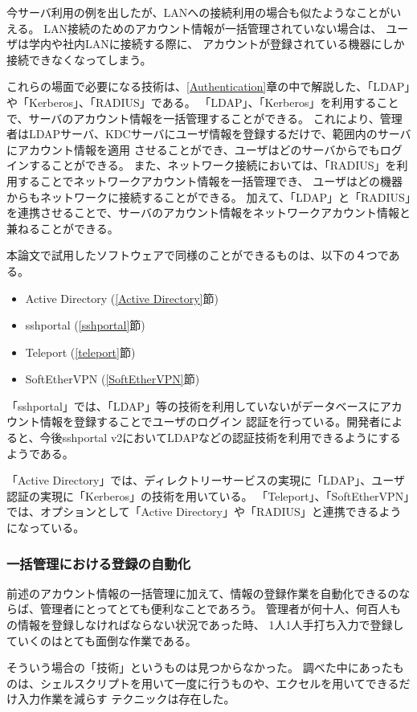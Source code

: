 \documentclass[11pt,a4j,titlepage]{jreport}
\begin{document}
今サーバ利用の例を出したが、LANへの接続利用の場合も似たようなことがいえる。
LAN接続のためのアカウント情報が一括管理されていない場合は、 ユーザは学内や社内LANに接続する際に、
アカウントが登録されている機器にしか接続できなくなってしまう。

これらの場面で必要になる技術は、\ref{Authentication}章の中で解説した、「LDAP」や「Kerberos」、「RADIUS」である。
「LDAP」、「Kerberos」を利用することで、サーバのアカウント情報を一括管理することができる。
これにより、管理者はLDAPサーバ、KDCサーバにユーザ情報を登録するだけで、範囲内のサーバにアカウント情報を適用
させることができ、ユーザはどのサーバからでもログインすることができる。
また、ネットワーク接続においては、「RADIUS」を利用することでネットワークアカウント情報を一括管理でき、
ユーザはどの機器からもネットワークに接続することができる。
加えて、「LDAP」と「RADIUS」を連携させることで、サーバのアカウント情報をネットワークアカウント情報と兼ねることができる。

\par 本論文で試用したソフトウェアで同様のことができるものは、以下の４つである。
\begin{itemize}
    \item Active Directory (\ref{Active Directory}節)
    \item sshportal (\ref{sshportal}節)
    \item Teleport (\ref{teleport}節)
    \item SoftEtherVPN (\ref{SoftEtherVPN}節)
\end{itemize}

「sshportal」では、「LDAP」等の技術を利用していないがデータベースにアカウント情報を登録することでユーザのログイン
認証を行っている。開発者によると、今後sshportal v2においてLDAPなどの認証技術を利用できるようにするようである。

「Active Directory」では、ディレクトリーサービスの実現に「LDAP」、ユーザ認証の実現に「Kerberos」の技術を用いている。
「Teleport」、「SoftEtherVPN」では、オプションとして「Active Directory」や「RADIUS」と連携できるようになっている。

\subsubsection*{一括管理における登録の自動化}
前述のアカウント情報の一括管理に加えて、情報の登録作業を自動化できるのならば、管理者にとってとても便利なことであろう。
管理者が何十人、何百人もの情報を登録しなければならない状況であった時、
1人1人手打ち入力で登録していくのはとても面倒な作業である。
\par そういう場合の「技術」というものは見つからなかった。
調べた中にあったものは、シェルスクリプトを用いて一度に行うものや、エクセルを用いてできるだけ入力作業を減らす
テクニックは存在した。
\end{document}
